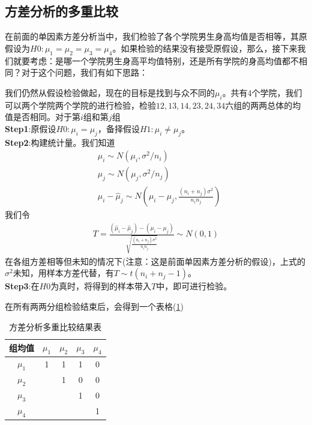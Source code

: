     \subsection{方差分析的多重比较}
        \par
        在前面的单因素方差分析当中，我们检验了各个学院男生身高均值是否相等，其原假设为$H0:\mu_1=\mu_2=\mu_3=\mu_4$。如果检验的结果没有接受原假设，那么，接下来我们就要考虑：是哪一个学院男生身高平均值特别，还是所有学院的身高均值都不相同？对于这个问题，我们有如下思路：
        \par
        我们仍然从假设检验做起，现在的目标是找到与众不同的$\mu_i$。共有4个学院，我们可以两个学院两个学院的进行检验，检验$12,13,14,23,24,34$六组的两两总体的均值是否相同。对于第$i$组和第$j$组\\
        \textbf{Step1}:原假设$H0: \mu_i = \mu_j$，备择假设$H1:\mu_i \neq \mu_j$。\\
        \textbf{Step2}:构建统计量。我们知道
        \begin{align*}
        &\hat{\mu}_i \sim N(\mu_i,\sigma^2/n_i)\\
        &\hat{\mu}_j \sim N(\mu_j,\sigma^2/n_j)\\
        &\hat{\mu}_i - \hat{\mu}_j \sim N\left(\mu_i-\mu_j,\frac{(n_i+n_j)\sigma^2}{n_in_j}\right)
        \end{align*}
        我们令
        \begin{align*}
        T = \frac{(\hat{\mu}_i - \hat{\mu}_j) - (\mu_i-\mu_j)}{\sqrt{\frac{(n_i+n_j)\sigma^2}{n_in_j}}} \sim N(0,1)
        \end{align*}
        在各组方差相等但未知的情况下(注意：这是前面单因素方差分析的假设)，上式的$\sigma^2$未知，用样本方差代替，有$T \sim t(n_i+n_j-1)$。\\
        \textbf{Step3}:在$H0$为真时，将得到的样本带入$T$中，即可进行检验。
        \par
        在所有两两分组检验结束后，会得到一个表格(\ref{tab:方差分析多重比较结果表})
        \begin{table}[H]\caption{方差分析多重比较结果表}
        \label{tab:方差分析多重比较结果表}
        \centering
        \begin{tabular}{c|cccc}%
        组均值 & ${\mu}_1$ & ${\mu}_2$ & ${\mu}_3$ & ${\mu}_4$ \\
        \hline
        ${\mu}_1$ & 1 & 1 & 1 & 0\\
        ${\mu}_2$ & {} & 1 & 0 & 0\\
        ${\mu}_3$ & {} & {} & 1 & 0\\
        ${\mu}_4$ & {} & {} & {} & 1\\
        \end{tabular}
        \end{table}
